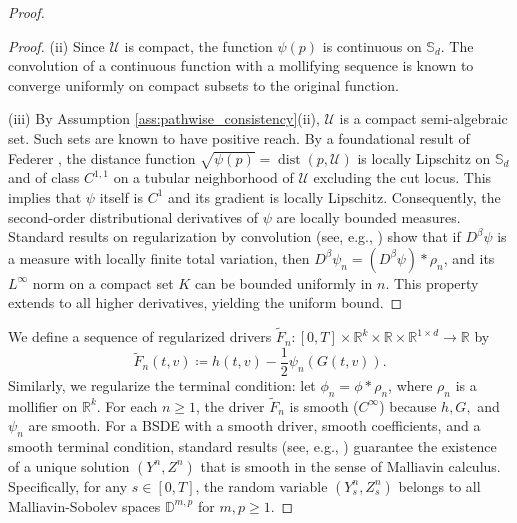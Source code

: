 \documentclass[12pt, letterpaper]{amsart}
\newcommand{\Ucal}{\mathcal{U}}
\newcommand{\Sd}{\mathbb{S}_d}
\newcommand{\R}{\mathbb{R}}
\DeclareMathOperator*{\dist}{dist}
\theoremstyle{plain}
\theoremstyle{definition}
\theoremstyle{remark}
\numberwithin{equation}{section} %
\begin{document}
\begin{proof}
\begin{proof}
(ii) Since \(\Ucal\) is compact, the function \(\psi(p)\) is continuous on \(\Sd\). The convolution of a continuous function with a mollifying sequence is known to converge uniformly on compact subsets to the original function.

(iii) By Assumption \ref{ass:pathwise_consistency}(ii), \(\Ucal\) is a compact semi-algebraic set. Such sets are known to have positive reach. By a foundational result of Federer \cite[Theorem 4.8]{Federer1959}, the distance function $\sqrt{\psi(p)} = \dist(p,\Ucal)$ is locally Lipschitz on $\Sd$ and of class $C^{1,1}$ on a tubular neighborhood of $\Ucal$ excluding the cut locus. This implies that $\psi$ itself is $C^1$ and its gradient is locally Lipschitz. Consequently, the second-order distributional derivatives of $\psi$ are locally bounded measures. Standard results on regularization by convolution (see, e.g., \cite[Appendix C.4]{Evans2010}) show that if $D^\beta \psi$ is a measure with locally finite total variation, then $D^\beta \psi_n = (D^\beta \psi) * \rho_n$, and its $L^\infty$ norm on a compact set $K$ can be bounded uniformly in $n$. This property extends to all higher derivatives, yielding the uniform bound.
\end{proof}

We define a sequence of regularized drivers \(\tilde{F}_n: [0,T] \times \R^k \times \R \times \R^{1\times d} \to \R\) by
\[ \tilde{F}_n(t,v) \coloneqq h(t,v) - \frac{1}{2}\psi_n(G(t,v)). \]
Similarly, we regularize the terminal condition: let $\phi_n = \phi * \rho_n$, where $\rho_n$ is a mollifier on $\R^k$.
For each \(n \ge 1\), the driver \(\tilde{F}_n\) is smooth ($C^\infty$) because \(h, G,\) and \(\psi_n\) are smooth. For a BSDE with a smooth driver, smooth coefficients, and a smooth terminal condition, standard results (see, e.g., \cite[Chapter 7]{MaYong1999}) guarantee the existence of a unique solution \((Y^n, Z^n)\) that is smooth in the sense of Malliavin calculus. Specifically, for any $s \in [0,T]$, the random variable $(Y^n_s, Z^n_s)$ belongs to all Malliavin-Sobolev spaces \(\mathbb{D}^{m,p}\) for \(m,p \ge 1\).


\end{proof}
\end{document}

